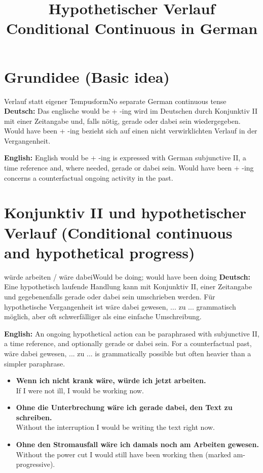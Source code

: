 \documentclass[a4paper,11pt]{article}
\title{Hypothetischer Verlauf\\\large\textnormal{Conditional Continuous in German}}
\date{}
\newcommand{\GermanText}[1]{\textbf{Deutsch: }#1\par}
\newcommand{\EnglishText}[1]{{\small\color{SoftGray}\textbf{English: }#1\par}}
\newcommand{\ExampleItem}[2]{\item \textbf{#1}\\{\small\color{SoftGray}#2}}
\begin{document}
    \maketitle
    \tableofcontents
    \newpage


\section{Grundidee \textnormal{(Basic idea)}}
\begin{grammarentry}{Verlauf statt eigener Tempusform}{No separate German continuous tense}
\GermanText{Das englische would be + -ing wird im Deutschen durch Konjunktiv II mit einer Zeitangabe und, falls nötig, gerade oder dabei sein wiedergegeben. Would have been + -ing bezieht sich auf einen nicht verwirklichten Verlauf in der Vergangenheit.}
\EnglishText{English would be + -ing is expressed with German subjunctive II, a time reference and, where needed, gerade or dabei sein. Would have been + -ing concerns a counterfactual ongoing activity in the past.}
\end{grammarentry}

\section{Konjunktiv II und hypothetischer Verlauf \textnormal{(Conditional continuous and hypothetical progress)}}
\begin{grammarentry}{würde arbeiten / wäre dabei}{Would be doing; would have been doing}
\GermanText{Eine hypothetisch laufende Handlung kann mit Konjunktiv II, einer Zeitangabe und gegebenenfalls gerade oder dabei sein umschrieben werden. Für hypothetische Vergangenheit ist wäre dabei gewesen, ... zu ... grammatisch möglich, aber oft schwerfälliger als eine einfache Umschreibung.}
\EnglishText{An ongoing hypothetical action can be paraphrased with subjunctive II, a time reference, and optionally gerade or dabei sein. For a counterfactual past, wäre dabei gewesen, ... zu ... is grammatically possible but often heavier than a simpler paraphrase.}
\end{grammarentry}
\begin{exbox}
\begin{itemize}
\ExampleItem{Wenn ich nicht krank wäre, würde ich jetzt arbeiten.}{If I were not ill, I would be working now.}
\ExampleItem{Ohne die Unterbrechung wäre ich gerade dabei, den Text zu schreiben.}{Without the interruption I would be writing the text right now.}
\ExampleItem{Ohne den Stromausfall wäre ich damals noch am Arbeiten gewesen.}{Without the power cut I would still have been working then (marked am-progressive).}
\end{itemize}
\end{exbox}
\end{document}
